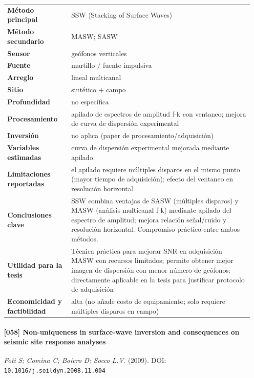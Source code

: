 \begin{center}\scriptsize
\begin{tabularx}{\textwidth}{@{}>{\bfseries}p{3.3cm} X@{}}
\toprule
M\'etodo principal & SSW (Stacking of Surface Waves) \\
M\'etodo secundario & MASW; SASW \\
Sensor & geófonos verticales \\
Fuente & martillo / fuente impulsiva \\
Arreglo & lineal multicanal \\
Sitio & sintético + campo \\
Profundidad & no específica \\
Procesamiento & apilado de espectros de amplitud f-k con ventaneo; mejora de curva de dispersión experimental \\
Inversi\'on & no aplica (paper de procesamiento/adquisición) \\
Variables estimadas & curva de dispersión experimental mejorada mediante apilado \\
Limitaciones reportadas & el apilado requiere múltiples disparos en el mismo punto (mayor tiempo de adquisición); efecto del ventaneo en resolución horizontal \\
Conclusiones clave & SSW combina ventajas de SASW (múltiples disparos) y MASW (análisis multicanal f-k) mediante apilado del espectro de amplitud; mejora relación señal/ruido y resolución horizontal. Compromiso práctico entre ambos métodos. \\
Utilidad para la tesis & Técnica práctica para mejorar SNR en adquisición MASW con recursos limitados; permite obtener mejor imagen de dispersión con menor número de geófonos; directamente aplicable en la tesis para justificar protocolo de adquisición \\
Economicidad y factibilidad & alta (no añade costo de equipamiento; solo requiere múltiples disparos en campo) \\
\bottomrule
\end{tabularx}
\end{center}

\paragraph{[058] Non-uniqueness in surface-wave inversion and consequences on seismic site response analyses} \emph{Foti S; Comina C; Boiero D; Socco L.V.} (2009).
{\scriptsize DOI: \texttt{10.1016/j.soildyn.2008.11.004}}

